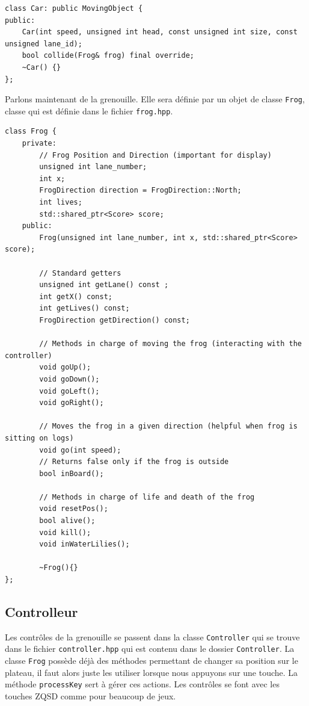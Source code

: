 \documentclass[a4paper, 12pt]{article}
\begin{document}
\begin{lstlisting}
class Car: public MovingObject {
public:
    Car(int speed, unsigned int head, const unsigned int size, const unsigned lane_id);
    bool collide(Frog& frog) final override;
    ~Car() {}
};
\end{lstlisting}

Parlons maintenant de la grenouille. 
Elle sera définie par un objet de classe \texttt{Frog}, 
classe qui est définie dans le fichier \texttt{frog.hpp}.

\begin{lstlisting}
class Frog {
    private:
        // Frog Position and Direction (important for display)
        unsigned int lane_number;
        int x;
        FrogDirection direction = FrogDirection::North;
        int lives;
        std::shared_ptr<Score> score;
    public:
        Frog(unsigned int lane_number, int x, std::shared_ptr<Score> score);

        // Standard getters
        unsigned int getLane() const ;
        int getX() const;
        int getLives() const;
        FrogDirection getDirection() const;

        // Methods in charge of moving the frog (interacting with the controller)
        void goUp();
        void goDown();
        void goLeft();
        void goRight();

        // Moves the frog in a given direction (helpful when frog is sitting on logs)
        void go(int speed);
        // Returns false only if the frog is outside
        bool inBoard();

        // Methods in charge of life and death of the frog
        void resetPos();
        bool alive();
        void kill();
        void inWaterLilies();

        ~Frog(){}
};
\end{lstlisting}

\subsection{Controlleur}

Les contrôles de la grenouille se passent dans la classe \texttt{Controller} 
qui se trouve dans le fichier \texttt{controller.hpp} qui est contenu dans 
le dossier \texttt{Controller}.
La classe \texttt{Frog} possède déjà des méthodes permettant de changer sa position 
sur le plateau, il faut alors juste les utiliser lorsque nous appuyons sur une touche. 
La méthode \texttt{processKey} sert à gérer ces actions. 
Les contrôles se font avec les touches ZQSD comme pour beaucoup de jeux. 
\end{document}
